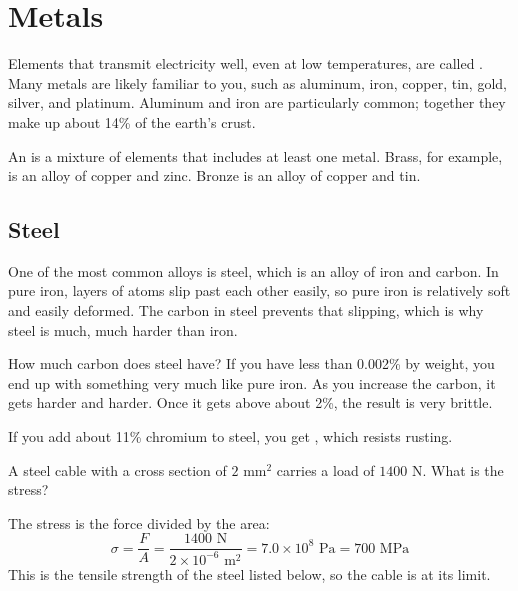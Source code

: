 \section{Metals}
Elements that transmit electricity well, even at low temperatures, are
called . Many metals are likely familiar to you, such as
aluminum, iron, copper, tin, gold, silver, and platinum. Aluminum and
iron are particularly common; together they make up about 14\% of the
earth's crust.

An  is a mixture of elements that includes at least one
metal. Brass, for example, is an alloy of copper and zinc.  Bronze is
an alloy of copper and tin.



\subsection{Steel}

One of the most common alloys is steel, which is an alloy of iron and carbon.
In pure iron, layers of atoms slip past each other easily, so pure iron
is relatively soft and easily deformed. The carbon in steel prevents
that slipping, which is why steel is much, much harder than iron.

How much carbon does steel have? If you have less than 0.002\% by weight, you end up
with something very much like pure iron.  As you increase the carbon,
it gets harder and harder. Once it gets above about 2\%, the result
is very brittle.

If you add about 11\% chromium to steel, you get , which resists rusting.

\begin{Worked}
\begin{Problem}
A steel cable with a cross section of $2$ mm$^2$ carries a load of $1400$ N. What is the stress?
\end{Problem}
\begin{Solution}
The stress is the force divided by the area:
$$\sigma = \frac{F}{A} = \frac{1400 \text{ N}}{2 \times 10^{-6} \text{ m}^2} = 7.0 \times 10^8 \text{ Pa} = 700 \text{ MPa}$$
This is the tensile strength of the steel listed below, so the cable is at its limit.
\end{Solution}
\end{Worked}

